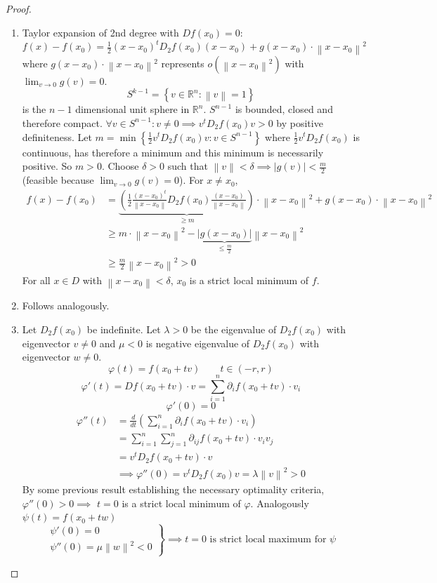 \documentclass{article}
\newcommand{\set}[1]{\left\{#1\right\}}
\newcommand{\norm}[1]{\left\|#1\right\|}
\newcommand{\card}[1]{\left|#1\right|}
\begin{document}
\begin{proof}
  \begin{enumerate}
    \item Taylor expansion of 2nd degree with $Df(x_0) = 0$: $f(x) - f(x_0) = \frac12 (x - x_0)^t D_2 f(x_0) (x - x_0) + g(x - x_0) \cdot \norm{x - x_0}^2$ where $g(x - x_0) \cdot \norm{x - x_0}^2$ represents $o(\norm{x - x_0}^2)$ with $\lim_{v \to 0} g(v) = 0$.
      \[ S^{k-1} = \set{v \in \mathbb R^n: \norm{v} = 1} \]
      is the $n-1$ dimensional unit sphere in $\mathbb R^n$.
      $S^{n-1}$ is bounded, closed and therefore compact. $\forall v \in S^{n-1}: v \neq 0 \implies v^t D_2 f(x_0) v > 0$ by positive definiteness.
      Let $m = \min\set{\frac12 v^t D_2 f(x_0) v: v \in S^{n-1}}$ where $\frac12 v^t D_2 f(x_0)$ is continuous, has therefore a minimum and this minimum is necessarily positive. So $m > 0$.
      Choose $\delta > 0$ such that $\norm{v} < \delta \implies \card{g(v)} < \frac{m}{2}$ (feasible because $\lim_{v\to0} g(v) = 0$).
      For $x \neq x_0$,
      \begin{align*}
        f(x) - f(x_0) &= \underbrace{\left(\frac12 \frac{(x - x_0)^t}{\norm{x - x_0}} D_2 f(x_0) \frac{(x - x_0)}{\norm{x - x_0}}\right)}_{\geq m} \cdot \norm{x - x_0}^2 + g(x - x_0) \cdot \norm{x - x_0}^2 \\
          &\geq m \cdot \norm{x - x_0}^2 - \underbrace{\card{g(x - x_0)}}_{\leq \frac m2} \norm{x - x_0}^2 \\
          &\geq \frac m2 \norm{x - x_0}^2 > 0
      \end{align*}
      For all $x \in D$ with $\norm{x - x_0} < \delta$, $x_0$ is a strict local minimum of $f$.
    \item Follows analogously.
    \item Let $D_2 f(x_0)$ be indefinite. Let $\lambda > 0$ be the eigenvalue of $D_2 f(x_0)$ with eigenvector $v \neq 0$ and $\mu < 0$ is negative eigenvalue of $D_2 f(x_0)$ with eigenvector $w \neq 0$.
      \[ \varphi(t) = f(x_0 + tv) \qquad t \in (-r, r) \]
      \[ \varphi'(t) = Df(x_0 + tv) \cdot v = \sum_{i=1}^n \partial_i f(x_0 + tv) \cdot v_i \]
      \[ \varphi'(0) = 0 \]
      \begin{align*}
        \varphi''(t) &= \frac{d}{dt} \left(\sum_{i=1}^n \partial_i f(x_0 + tv) \cdot v_i\right) \\
            &= \sum_{i=1}^n \sum_{j=1}^n \partial_{ij} f(x_0 + tv) \cdot v_i v_j \\
            &= v^t D_2 f(x_0 + tv) \cdot v \\
            &\implies \varphi''(0) = v^t D_2 f(x_0) v = \lambda \norm{v}^2 > 0
      \end{align*}
      By some previous result establishing the necessary optimality criteria, $\varphi''(0) > 0 \implies$ $t=0$ is a strict local minimum of $\varphi$.
      Analogously $\psi(t) = f(x_0 + tw)$
      \[
        \left.\begin{array}{c}
          \psi'(0) = 0 \\
          \psi''(0) = \mu \norm{w}^2 < 0
        \end{array}\right\}
        \implies \text{$t = 0$ is strict local maximum for $\psi$}
      \]


\end{enumerate}
\end{proof}
\end{document}
